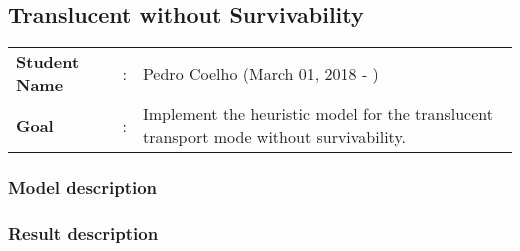 \clearpage

\subsection{Translucent without Survivability}\label{heuristic_Transluc_Survivability}
\begin{tcolorbox}	
\begin{tabular}{p{2.75cm} p{0.2cm} p{10.5cm}} 	
\textbf{Student Name}  &:& Pedro Coelho    (March 01, 2018 - )\\
\textbf{Goal}          &:& Implement the heuristic model for the translucent transport mode without survivability.
\end{tabular}
\end{tcolorbox}

\subsubsection{Model description}

\subsubsection{Result description} 